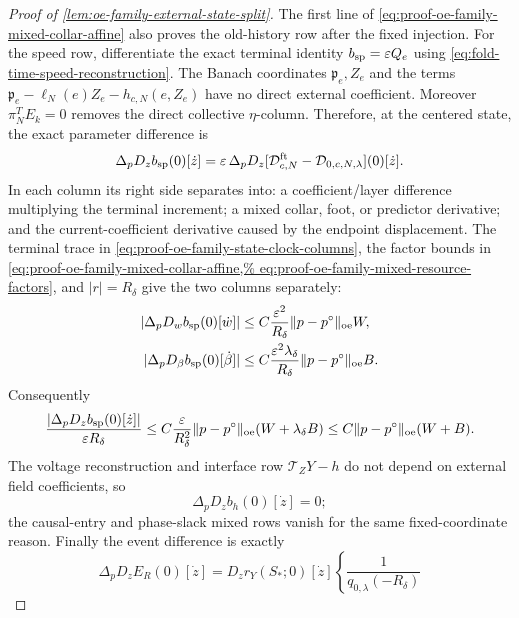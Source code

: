 \begin{proof}[Proof of
\cref{lem:oe-family-external-state-split}]
The first line of
\cref{eq:proof-oe-family-mixed-collar-affine} also proves the old-history
row after the fixed injection.  For the speed row, differentiate the exact
terminal identity \(b_{\rm sp}=\varepsilon Q_e\) using
\cref{eq:fold-time-speed-reconstruction}.  The Banach coordinates
\(\mathfrak p_e,Z_e\) and the terms
\(\mathfrak p_e-\ell_N(e)Z_e-h_{c,N}(e,Z_e)\) have no direct external
coefficient.  Moreover \(\pi_N^TE_k=0\) removes the direct collective
\(\eta\)-column.  Therefore, at the centered state, the exact parameter
difference is
\begin{equation}
 \Delta_pD_zb_{\rm sp}(0)[\dot z]
 =\varepsilon\,\Delta_pD_z
   [\mathcal D_{c,N}^{\rm ft}
       -\mathcal D_{0,c,N,\lambda}](0)[\dot z].
                                                        \label{eq:proof-oe-family-mixed-speed-cancellation}
\end{equation}
In each column its right side separates into: a coefficient/layer
difference multiplying the terminal increment; a mixed collar, foot, or
predictor derivative; and the current-coefficient derivative caused by
the endpoint displacement.
The terminal trace in
\cref{eq:proof-oe-family-state-clock-columns}, the factor bounds in
\cref{eq:proof-oe-family-mixed-collar-affine,%
eq:proof-oe-family-mixed-resource-factors}, and
\(|r|=R_\delta\) give the two columns separately:
\begin{align}
 |\Delta_pD_wb_{\rm sp}(0)[\dot w]|
 &\le C\frac{\varepsilon^2}{R_\delta}
       \|p-p^\circ\|_{\rm oe}W,\notag\\
 |\Delta_pD_\beta b_{\rm sp}(0)[\dot\beta]|
 &\le C\frac{\varepsilon^2\lambda_\delta}{R_\delta}
       \|p-p^\circ\|_{\rm oe}B.                 \label{eq:proof-oe-family-mixed-speed-columns}
\end{align}
Consequently
\begin{equation}
 \frac{|\Delta_pD_zb_{\rm sp}(0)[\dot z]|}
      {\varepsilon R_\delta}
 \le C\frac{\varepsilon}{R_\delta^2}
       \|p-p^\circ\|_{\rm oe}(W+\lambda_\delta B)
 \le C\|p-p^\circ\|_{\rm oe}(W+B).              \label{eq:proof-oe-family-mixed-speed}
\end{equation}
The voltage reconstruction and interface row
\(\mathcal T_ZY-h\) do not depend on external field coefficients, so
\[
 \Delta_pD_zb_h(0)[\dot z]=0;
\]
the causal-entry and phase-slack mixed rows vanish for the same
fixed-coordinate reason.  Finally the event difference is exactly
\begin{equation}
 \Delta_pD_zE_R(0)[\dot z]
 =D_zr_Y(S_*;0)[\dot z]
 \left\{\frac1{q_{0,\lambda}(-R_\delta)}

\end{equation}
\end{proof}

